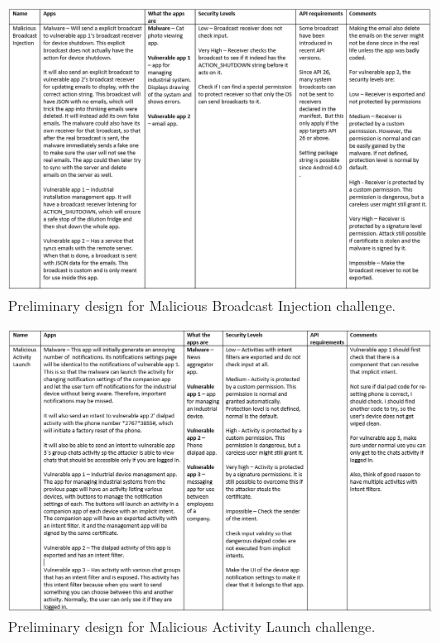 \begin{landscape}
    \begin{figure}[h]
        \centering
        \includegraphics[width=1.4\textwidth]{graphics/malicious_broadcast_injection.PNG}
        \caption{Preliminary design for Malicious Broadcast Injection challenge.}
        \label{fig:malicious_broadcast_injection_design}
    \end{figure}
    
    \begin{figure}[h]
        \centering
        \includegraphics[width=1.4\textwidth]{graphics/malicious_activity_launch.PNG}
        \caption{Preliminary design for Malicious Activity Launch challenge.}
        \label{fig:malicious_activity_launch_design}
    \end{figure}
    

\end{landscape}
